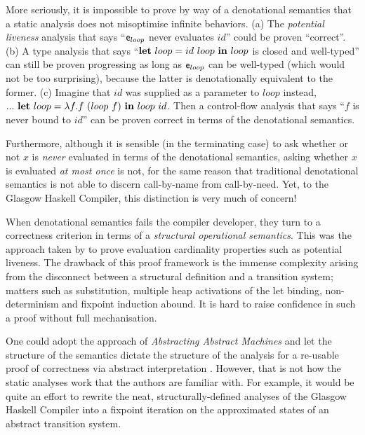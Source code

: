 More seriously, it is impossible to prove by way of a denotational semantics
that a static analysis does not misoptimise infinite behaviors.
(a) The \emph{potential liveness} analysis that says ``$\mathsf{e}_{loop}$ never
evaluates $id$'' could be proven ``correct''.
(b) A type analysis that says ``$\mathbf{let}~{loop}={id~loop}~\mathbf{in}~{loop}$ is closed and
well-typed'' can still be proven progressing as long as $\mathsf{e}_{loop}$ can
be well-typed (which would not be too surprising), because the latter is
denotationally equivalent to the former.
(c) Imagine that $id$ was supplied as a parameter to $loop$ instead, \eg
$...\ \Let{loop}{\Lam{f}{f~(loop~f)}}{loop~id}$. Then a control-flow analysis
\cite{Shivers:91} that says ``$f$ is never bound to $id$'' can be proven correct
in terms of the denotational semantics.

Furthermore, although it is sensible (in the terminating case) to ask whether or
not $x$ is \emph{never} evaluated in terms of the denotational semantics, asking
whether $x$ is evaluated \emph{at most once} is not, for the same reason that
traditional denotational semantics is not able to discern call-by-name from
call-by-need. Yet, to the Glasgow Haskell Compiler, this distinction is very
much of concern!

When denotational semantics fails the compiler developer, they turn to a
correctness criterion in terms of a \emph{structural operational semantics}.
This was the approach taken by \cite{cardinality} to prove evaluation
cardinality properties such as potential liveness. The drawback of this proof
framework is the immense complexity arising from the disconnect between a
structural definition and a transition system; matters such as substitution,
multiple heap activations of the let binding, non-determinism and fixpoint
induction abound. It is hard to raise confidence in such a proof without full
mechanisation.

One could adopt the approach of \emph{Abstracting Abstract Machines} \cite{aam}
and let the structure of the semantics dictate the structure of the
analysis for a re-usable proof of correctness via abstract interpretation
\cite{Cousot:21}.
However, that is not how the static analyses work that the authors are familiar
with.
For example, it would be quite an effort to rewrite the neat,
structurally-defined analyses of the Glasgow Haskell Compiler into a fixpoint
iteration on the approximated states of an abstract transition system.

